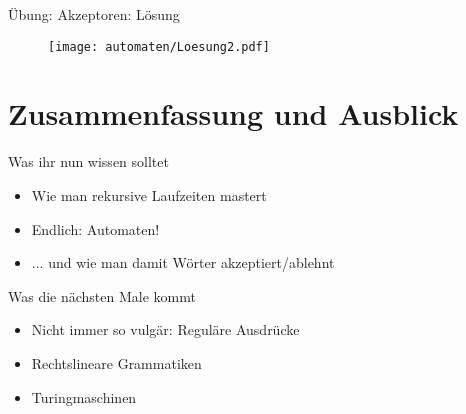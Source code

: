 \begin{frame}{Übung: Akzeptoren: Lösung}
	\begin{figure}
		\centering
		\texttt{[image: automaten/Loesung2.pdf]}
	\end{figure}
\end{frame}


\appendix
\beginbackup

\section{Zusammenfassung und Ausblick}

\begin{frame}
	\begin{block}{Was ihr nun wissen solltet}
		\begin{itemize}
			\item Wie man rekursive Laufzeiten mastert
			\item Endlich: Automaten!
			\item ... und wie man damit Wörter akzeptiert/ablehnt
		\end{itemize}
	\end{block}
	
	\begin{block}{Was die nächsten Male kommt}
		\begin{itemize}
			\item Nicht immer so vulgär: Reguläre Ausdrücke
			\item Rechtslineare Grammatiken
			\item Turingmaschinen
		\end{itemize}
	\end{block}
\end{frame}











\backupend
